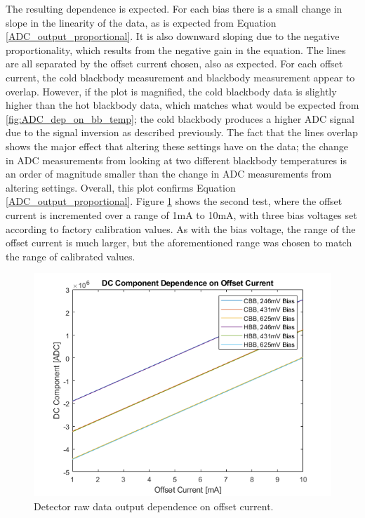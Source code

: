 The resulting dependence is expected. For each bias there is a small change in slope in the linearity of the data, as is expected from Equation \ref{ADC_output_proportional}. It is also downward sloping due to the negative proportionality, which results from the negative gain in the equation. The lines are all separated by the offset current chosen, also as expected. For each offset current, the cold blackbody measurement and blackbody measurement appear to overlap. However, if the plot is magnified, the cold blackbody data is slightly higher than the hot blackbody data, which matches what would be expected from \ref{fig:ADC_dep_on_bb_temp}; the cold blackbody produces a higher ADC signal due to the signal inversion as described previously. The fact that the lines overlap shows the major effect that altering these settings have on the data; the change in ADC measurements from looking at two different blackbody temperatures is an order of magnitude smaller than the change in ADC measurements from altering settings. Overall, this plot confirms Equation \ref{ADC_output_proportional}. Figure \ref{fig:dc_dep_on_offset} shows the second test, where the offset current is incremented over a range of 1mA to 10mA, with three bias voltages set according to factory calibration values. As with the bias voltage, the range of the offset current is much larger, but the aforementioned range was chosen to match the range of calibrated values.

\begin{figure}[h]
  \centering
  \includegraphics[width=0.9\linewidth]{chap6_images/verification/dc_component_dependence_on_offset_current.png}
  \caption{Detector raw data output dependence on offset current.}
  \label{fig:dc_dep_on_offset}
\end{figure}

